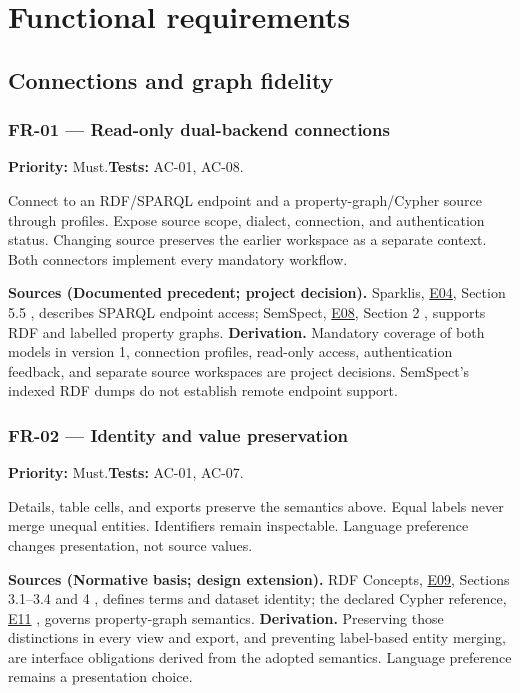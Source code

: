 \documentclass[11pt,a4paper]{article}
\newcommand{\req}[4]{\subsubsection*{#1 --- #2}\phantomsection\label{req:#1}\textbf{Priority:} #3.\quad\textbf{Tests:} #4.\par}
\newcommand{\origin}[3]{\par{\small\textbf{Sources (#1).} #2 \textbf{Derivation.} #3\par}}
\newcommand{\evidence}[1]{\hyperlink{evidence:#1}{#1}}
\begin{document}
\section{Functional requirements}
\subsection{Connections and graph fidelity}
\par\noindent\begin{minipage}{\linewidth}
\req{FR-01}{Read-only dual-backend connections}{Must}{AC-01, AC-08}
Connect to an RDF/SPARQL endpoint and a property-graph/Cypher source through profiles. Expose source scope, dialect, connection, and authentication status. Changing source preserves the earlier workspace as a separate context. Both connectors implement every mandatory workflow.
\origin{Documented precedent; project decision}{Sparklis, \evidence{E04}, Section 5.5 \citep{sparklis}, describes SPARQL endpoint access; SemSpect, \evidence{E08}, Section 2 \citep{semspect}, supports RDF and labelled property graphs.}{Mandatory coverage of both models in version 1, connection profiles, read-only access, authentication feedback, and separate source workspaces are project decisions. SemSpect's indexed RDF dumps do not establish remote endpoint support.}
\end{minipage}\par
\par\noindent\begin{minipage}{\linewidth}
\req{FR-02}{Identity and value preservation}{Must}{AC-01, AC-07}
Details, table cells, and exports preserve the semantics above. Equal labels never merge unequal entities. Identifiers remain inspectable. Language preference changes presentation, not source values.
\origin{Normative basis; design extension}{RDF Concepts, \evidence{E09}, Sections 3.1--3.4 and 4 \citep{rdfconcepts}, defines terms and dataset identity; the declared Cypher reference, \evidence{E11} \citep{opencypher}, governs property-graph semantics.}{Preserving those distinctions in every view and export, and preventing label-based entity merging, are interface obligations derived from the adopted semantics. Language preference remains a presentation choice.}
\end{minipage}\par
\end{document}
